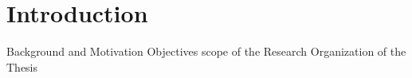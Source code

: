 \newpage
\chapter{Introduction}

Background and Motivation
Objectives scope of the Research 
Organization of the Thesis